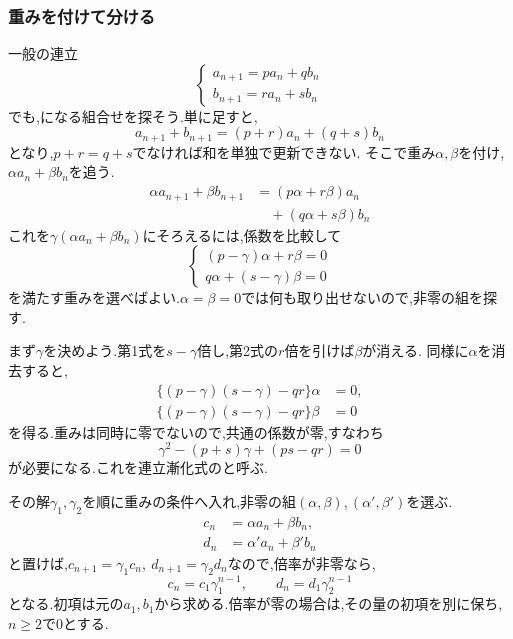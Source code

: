 \subsubsection{重みを付けて分ける}
一般の連立
\[
  \begin{cases}
    a_{n+1}=pa_n+qb_n\\
    b_{n+1}=ra_n+sb_n
  \end{cases}
\]
でも,になる組合せを探そう.単に足すと,
\[
  a_{n+1}+b_{n+1}=(p+r)a_n+(q+s)b_n
\]
となり,$p+r=q+s$でなければ和を単独で更新できない.
そこで重み$\alpha,\beta$を付け,$\alpha a_n+\beta b_n$を追う.
\[
  \begin{aligned}
    \alpha a_{n+1}+\beta b_{n+1}
    &=(p\alpha+r\beta)a_n\\
    &\quad+(q\alpha+s\beta)b_n
  \end{aligned}
\]
これを$\gamma(\alpha a_n+\beta b_n)$にそろえるには,係数を比較して
\[
  \begin{cases}
    (p-\gamma)\alpha+r\beta=0\\
    q\alpha+(s-\gamma)\beta=0
  \end{cases}
\]
を満たす重みを選べばよい.$\alpha=\beta=0$では何も取り出せないので,非零の組を探す.

まず$\gamma$を決めよう.第1式を$s-\gamma$倍し,第2式の$r$倍を引けば$\beta$が消える.
同様に$\alpha$を消去すると,
\begin{align*}
  \{(p-\gamma)(s-\gamma)-qr\}\alpha&=0,\\
  \{(p-\gamma)(s-\gamma)-qr\}\beta&=0
\end{align*}
を得る.重みは同時に零でないので,共通の係数が零,すなわち
\[
  \gamma^2-(p+s)\gamma+(ps-qr)=0
\]
が必要になる.これを連立漸化式のと呼ぶ.

その解$\gamma_1,\gamma_2$を順に重みの条件へ入れ,非零の組$(\alpha,\beta),(\alpha',\beta')$を選ぶ.
\begin{align*}
  c_n&=\alpha a_n+\beta b_n,\\
  d_n&=\alpha'a_n+\beta'b_n
\end{align*}
と置けば,$c_{n+1}=\gamma_1c_n,\ d_{n+1}=\gamma_2d_n$なので,倍率が非零なら,
\[
  c_n=c_1\gamma_1^{n-1},\qquad
  d_n=d_1\gamma_2^{n-1}
\]
となる.初項は元の$a_1,b_1$から求める.倍率が零の場合は,その量の初項を別に保ち,$n\ge2$で$0$とする.

